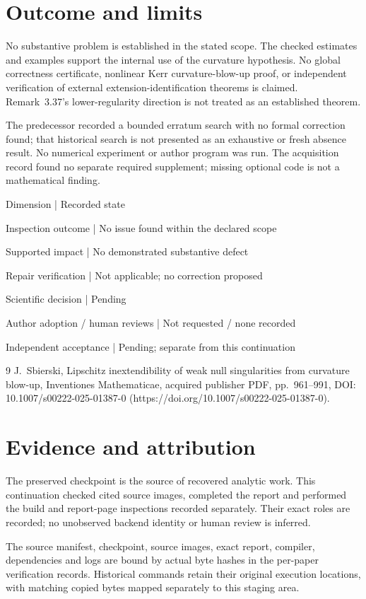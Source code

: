 \documentclass[10pt]{article}
\begin{document}
\section*{Outcome and limits}
No substantive problem is established in the stated scope. The checked estimates and examples support the internal use of the curvature hypothesis. No global correctness certificate, nonlinear Kerr curvature-blow-up proof, or independent verification of external extension-identification theorems is claimed. Remark 3.37’s lower-regularity direction is not treated as an established theorem.\par
The predecessor recorded a bounded erratum search with no formal correction found; that historical search is not presented as an exhaustive or fresh absence result. No numerical experiment or author program was run. The acquisition record found no separate required supplement; missing optional code is not a mathematical finding.\par
Dimension | Recorded state\par
Inspection outcome | No issue found within the declared scope\par
Supported impact | No demonstrated substantive defect\par
Repair verification | Not applicable; no correction proposed\par
Scientific decision | Pending\par
Author adoption / human reviews | Not requested / none recorded\par
Independent acceptance | Pending; separate from this continuation\par
9 J. Sbierski, Lipschitz inextendibility of weak null singularities from curvature blow-up, Inventiones Mathematicae, acquired publisher PDF, pp. 961–991, DOI: 10.1007/s00222-025-01387-0 (https://doi.org/10.1007/s00222-025-01387-0).\par
\section*{Evidence and attribution}
The preserved checkpoint is the source of recovered analytic work. This continuation checked cited source images, completed the report and performed the build and report-page inspections recorded separately. Their exact roles are recorded; no unobserved backend identity or human review is inferred.\par
The source manifest, checkpoint, source images, exact report, compiler, dependencies and logs are bound by actual byte hashes in the per-paper verification records. Historical commands retain their original execution locations, with matching copied bytes mapped separately to this staging area.\par
\end{document}
